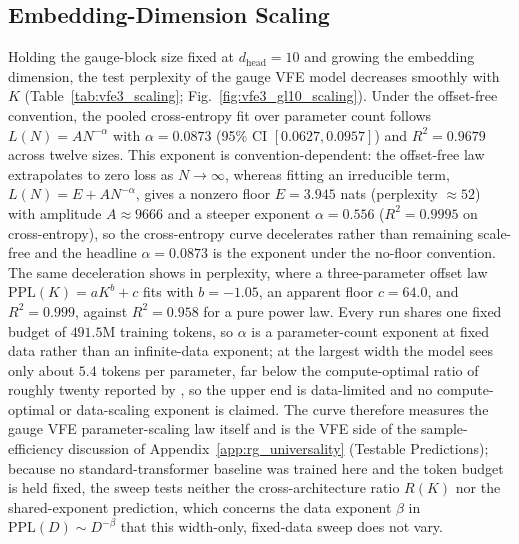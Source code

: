 \documentclass[twoside,11pt]{article}
\begin{document}
\subsection{Embedding-Dimension Scaling}
\label{app:vfe3_scaling}
Holding the gauge-block size fixed at $d_{\text{head}} = 10$ and growing the embedding dimension, the test perplexity of the gauge VFE model decreases smoothly with $K$ (Table~\ref{tab:vfe3_scaling}; Fig.~\ref{fig:vfe3_gl10_scaling}). Under the offset-free convention, the pooled cross-entropy fit over parameter count follows $L(N) = A N^{-\alpha}$ with $\alpha = 0.0873$ (95\% CI $[0.0627, 0.0957]$) and $R^2 = 0.9679$ across twelve sizes. This exponent is convention-dependent: the offset-free law extrapolates to zero loss as $N \to \infty$, whereas fitting an irreducible term, $L(N) = E + A N^{-\alpha}$, gives a nonzero floor $E = 3.945$ nats (perplexity $\approx 52$) with amplitude $A \approx 9666$ and a steeper exponent $\alpha = 0.556$ ($R^2 = 0.9995$ on cross-entropy), so the cross-entropy curve decelerates rather than remaining scale-free and the headline $\alpha = 0.0873$ is the exponent under the no-floor convention. The same deceleration shows in perplexity, where a three-parameter offset law $\mathrm{PPL}(K) = a K^{b} + c$ fits with $b = -1.05$, an apparent floor $c = 64.0$, and $R^2 = 0.999$, against $R^2 = 0.958$ for a pure power law. Every run shares one fixed budget of $491.5$M training tokens, so $\alpha$ is a parameter-count exponent at fixed data rather than an infinite-data exponent; at the largest width the model sees only about $5.4$ tokens per parameter, far below the compute-optimal ratio of roughly twenty reported by \citet{HoffmannChinchilla2022}, so the upper end is data-limited and no compute-optimal or data-scaling exponent is claimed. The curve therefore measures the gauge VFE parameter-scaling law itself and is the VFE side of the sample-efficiency discussion of Appendix~\ref{app:rg_universality} (Testable Predictions); because no standard-transformer baseline was trained here and the token budget is held fixed, the sweep tests neither the cross-architecture ratio $R(K)$ nor the shared-exponent prediction, which concerns the data exponent $\beta$ in $\mathrm{PPL}(D) \sim D^{-\beta}$ that this width-only, fixed-data sweep does not vary.
\end{document}
